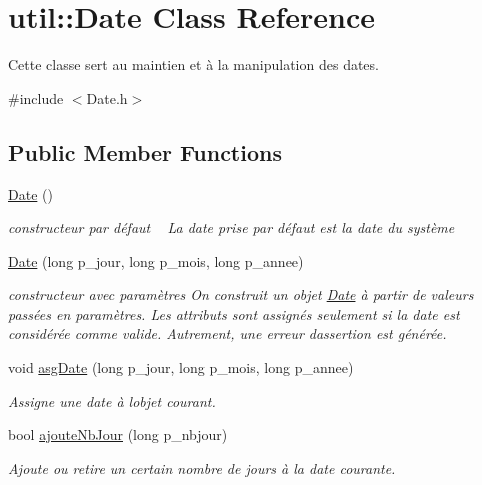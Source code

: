 \hypertarget{classutil_1_1Date}{}\section{util\+:\+:Date Class Reference}
\label{classutil_1_1Date}


Cette classe sert au maintien et à la manipulation des dates.  




{\ttfamily \#include $<$Date.\+h$>$}

\subsection*{Public Member Functions}
\begin{DoxyCompactItemize}
\item 
\mbox{\label{classutil_1_1Date_a03f7ca00aa80f113bc7c0ebfbd769f54}} 
\hyperlink{classutil_1_1Date_a03f7ca00aa80f113bc7c0ebfbd769f54}{Date} ()
\begin{DoxyCompactList}\small\item\em constructeur par défaut ~\newline
La date prise par défaut est la date du système \end{DoxyCompactList}\item 
\hyperlink{classutil_1_1Date_a06b8340e5beed84c885c89d41a750330}{Date} (long p\+\_\+jour, long p\+\_\+mois, long p\+\_\+annee)
\begin{DoxyCompactList}\small\item\em constructeur avec paramètres On construit un objet \hyperlink{classutil_1_1Date}{Date} à partir de valeurs passées en paramètres. Les attributs sont assignés seulement si la date est considérée comme valide. Autrement, une erreur d\textquotesingle{}assertion est générée. \end{DoxyCompactList}\item 
void \hyperlink{classutil_1_1Date_ab82f59d834f60b929ca130f15e5279c3}{asg\+Date} (long p\+\_\+jour, long p\+\_\+mois, long p\+\_\+annee)
\begin{DoxyCompactList}\small\item\em Assigne une date à l\textquotesingle{}objet courant. \end{DoxyCompactList}\item 
bool \hyperlink{classutil_1_1Date_a7788599612a71d89126d649fdaaced3d}{ajoute\+Nb\+Jour} (long p\+\_\+nbjour)
\begin{DoxyCompactList}\small\item\em Ajoute ou retire un certain nombre de jours à la date courante. \end{DoxyCompactList}\item 

\end{DoxyCompactItemize}
